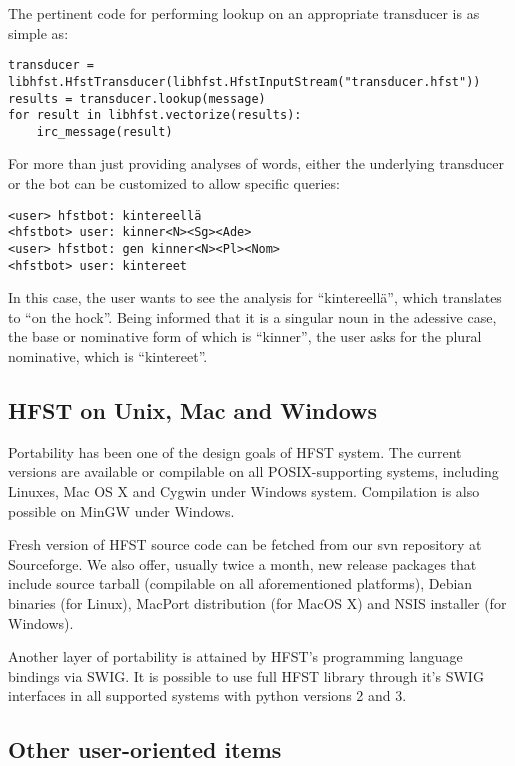 \documentclass{llncs}
\begin{document}
The pertinent code for performing lookup on an appropriate transducer
is as simple as:

\begin{verbatim}
transducer = libhfst.HfstTransducer(libhfst.HfstInputStream("transducer.hfst"))
results = transducer.lookup(message)
for result in libhfst.vectorize(results):
    irc_message(result)
\end{verbatim}

For more than just providing analyses of words, either the underlying transducer
or the bot can be customized to allow
specific queries:

\begin{verbatim}
<user> hfstbot: kintereellä
<hfstbot> user: kinner<N><Sg><Ade>
<user> hfstbot: gen kinner<N><Pl><Nom>
<hfstbot> user: kintereet
\end{verbatim}

In this case, the user wants to see the analysis for ``kintereellä'',
which translates to ``on the hock''. Being informed that it is
a singular noun in the adessive case, the base or nominative form of which
is ``kinner'', the user asks for the plural nominative, which is ``kintereet''.

\subsection{HFST on Unix, Mac and Windows}

Portability has been one of the design goals of HFST system. The
current versions are available or compilable on all POSIX-supporting
systems, including Linuxes, Mac OS X and Cygwin under Windows
system. Compilation is also possible on MinGW under Windows.

Fresh version of HFST source code can be fetched from our svn
repository at Sourceforge. We also offer, usually twice a month, new
release packages that include source tarball (compilable on all
aforementioned platforms), Debian binaries (for Linux), MacPort
distribution (for MacOS X) and NSIS installer (for Windows).

Another layer of portability is attained by HFST's programming
language bindings via SWIG. It is possible to use full HFST library
through it's SWIG interfaces in all supported systems with python
versions 2 and 3.


\subsection{Other user-oriented items}
\end{document}
